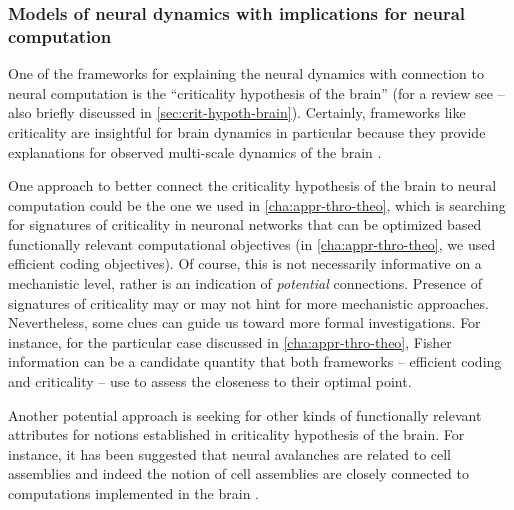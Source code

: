 \subsubsection{Models of neural dynamics with implications  for neural computation}

One of the frameworks for explaining the neural dynamics with connection to neural computation is the ``criticality hypothesis of the brain'' 
(for a review see \cite{munozColloquiumCriticalityDynamical2018} -- also briefly discussed in \autoref{sec:crit-hypoth-brain}).
Certainly, frameworks like criticality are insightful for brain dynamics
\cite{munozColloquiumCriticalityDynamical2018}
in particular because they provide explanations for observed multi-scale dynamics of the brain \cite{agrawalScaleChangeSymmetryRules2019}.

One approach to better connect the criticality hypothesis of the brain to neural computation could be the one we used in \autoref{cha:appr-thro-theo},
which is searching for signatures of criticality in neuronal networks that can be optimized based functionally relevant computational objectives
(in \autoref{cha:appr-thro-theo}, we used efficient coding objectives).
Of course, this is not necessarily informative on a mechanistic level,
rather is an indication of \emph{potential} connections.
Presence of signatures of criticality may or may not hint for more mechanistic approaches.
Nevertheless, some clues can guide us toward more formal investigations.
For instance, for the particular case discussed in \autoref{cha:appr-thro-theo},
Fisher information can be a candidate quantity that both frameworks -- efficient coding \cite{weiMutualInformationFisher2015} and criticality \cite{prokopenkoRelatingFisherInformation2011,danielsQuantifyingCollectivity2016,kalloniatisFisherInformationCriticality2018,kueblerOptimalFisherDecoding2019} -- use to assess the closeness to their optimal point.

Another potential approach is seeking 
for other kinds of functionally relevant attributes for notions established in criticality hypothesis of the brain.
For instance, it has been suggested that neural avalanches are related to cell assemblies  \cite{plenzOrganizingPrinciplesNeuronal2007} and
indeed the notion of cell assemblies are closely connected to computations implemented in the brain 
\cite{singerFormationCorticalCell1990a,harrisOrganizationCellAssemblies2003,harrisNeuralSignaturesCell2005a,buzsakiNeuralSyntaxCell2010b,tetzlaffUseHebbianCell2015}.

